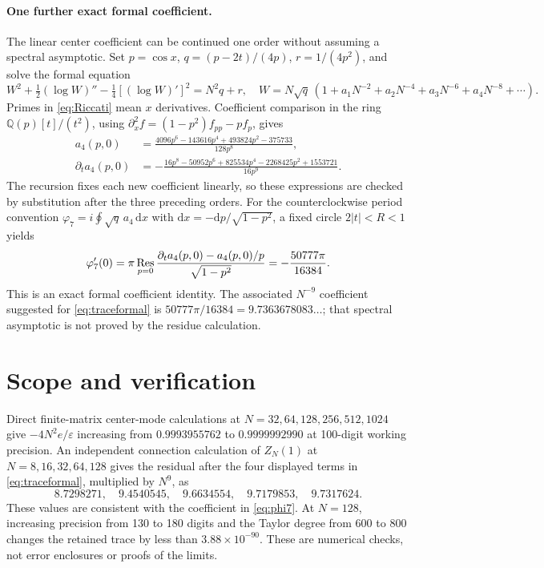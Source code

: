 \documentclass[10pt]{article}
\newcommand{\dd}{\mathrm d}
\begin{document}
\paragraph{One further exact formal coefficient.}
The linear center coefficient can be continued one order without
assuming a spectral asymptotic. Set $p=\cos x$,
$q=(p-2t)/(4p)$, $r=1/(4p^2)$, and solve the formal equation
\begin{equation}
W^2+\tfrac12(\log W)''-\tfrac14[(\log W)']^2=N^2q+r,
\quad
W=N\sqrt q\,(1+a_1N^{-2}+a_2N^{-4}+a_3N^{-6}+a_4N^{-8}+\cdots).
\label{eq:Riccati}
\end{equation}
Primes in \eqref{eq:Riccati} mean $x$ derivatives.
Coefficient comparison in the ring $\mathbb Q(p)[t]/(t^2)$, using
$\partial_x^2 f=(1-p^2)f_{pp}-pf_p$, gives
\begin{align}
a_4(p,0)&=
\frac{4096p^6-143616p^4+493824p^2-375733}{128p^8},\nonumber\\
\partial_ta_4(p,0)&=
-\frac{16p^8-50952p^6+825534p^4-2268425p^2+1553721}{16p^9}.
\label{eq:a4}
\end{align}
The recursion fixes each new coefficient linearly, so these expressions
are checked by substitution after the three preceding orders.
For the counterclockwise period convention
$\varphi_7=i\oint\sqrt q\,a_4\,\dd x$ with
$\dd x=-\dd p/\sqrt{1-p^2}$, a fixed circle $2|t|<R<1$ yields
\begin{equation}
\varphi_7'(0)
=\pi\mathop{\rm Res}_{p=0}
\frac{\partial_ta_4(p,0)-a_4(p,0)/p}{\sqrt{1-p^2}}
=-\frac{50777\pi}{16384}.
\label{eq:phi7}
\end{equation}
This is an exact formal coefficient identity. The associated
$N^{-9}$ coefficient suggested for \eqref{eq:traceformal} is
$50777\pi/16384=9.7363678083\ldots$; that spectral asymptotic is
not proved by the residue calculation.

\section{Scope and verification}
Direct finite-matrix center-mode calculations at
$N=32,64,128,256,512,1024$ give
$-4N^2e/\varepsilon$ increasing from $0.9993955762$ to
$0.9999992990$ at 100-digit working precision.
An independent connection calculation of $Z_N(1)$ at
$N=8,16,32,64,128$ gives the residual after the four displayed terms
in \eqref{eq:traceformal}, multiplied by $N^9$, as
\[
8.7298271,\quad9.4540545,\quad9.6634554,\quad
9.7179853,\quad9.7317624.
\]
These values are consistent with the coefficient in \eqref{eq:phi7}.
At $N=128$, increasing precision from 130 to 180 digits and the
Taylor degree from 600 to 800 changes the retained trace by less than
$3.88\times10^{-90}$. These are numerical checks, not error enclosures
or proofs of the limits.
\end{document}
